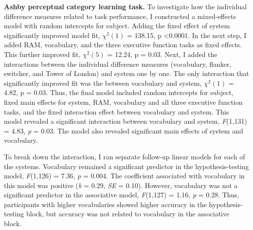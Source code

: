\documentclass[../dissertation.tex]{subfiles}
\begin{document}
\textbf{Ashby perceptual category learning task.} To investigate how the individual difference measures related to task performance, I constructed a mixed-effects model with random intercepts for subject. Adding the fixed effect of system significantly improved model fit,  $\chi^{2}(1)$ = 138.15, p \textless 0.0001. In the next step, I added RAM, vocabulary, and the three executive function tasks as fixed effects. This further improved fit, $\chi^{2}(5)$ = 12.24, p = 0.03. Next, I added the interactions between the individual difference measures (vocabulary, flanker, switcher, and Tower of London) and system one by one. The only interaction that significantly improved fit was the between vocabulary and system, $\chi^{2}(1)$ = 4.82, p = 0.03. Thus, the final model included random intercepts for subject, fixed main effects for system, RAM, vocabulary and all three executive function tasks, and the fixed interaction effect between vocabulary and system. This model revealed a significant interaction between vocabulary and system, \textit{F}(1,131) = 4.83, \textit{p} = 0.03. The model also revealed significant main effects of system and vocabulary. \par 
	To break down the interaction, I ran separate follow-up linear models for each of the systems. Vocabulary remained a significant predictor in the hypothesis-testing model, \textit{F}(1,126) = 7.36, \textit{p} = 0.004. The coefficient associated with vocabulary in this model was positive (\textit{b} = 0.29, \textit{SE} = 0.10). However, vocabulary was not a significant predictor in the associative model, \textit{F}(1,127) = 1.16, \textit{p} = 0.28. Thus, participants with higher vocabularies showed higher accuracy in the hypothesis-testing block, but accuracy was not related to vocabulary in the associative block. \par
\end{document}
